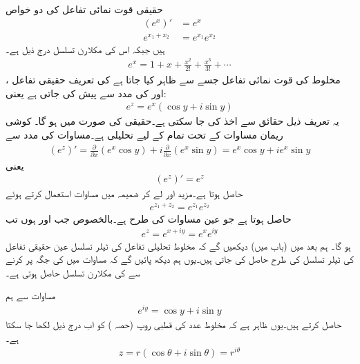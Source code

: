 حقیقی قوت نمائی تفاعل  کی دو خواص
\begin{align}
(e^x)'&=e^x\label{مساوات_مخلوط_قوت_نمائی_حقیقی_الف}\\
e^{x_1+x_2}&=e^{x_1}e^{x_2}\label{مساوات_مخلوط_قوت_نمائی_حقیقی_ب}
\end{align}
ہیں جبکہ اس کی مکلارن تسلسل درج ذیل ہے۔
\begin{align}
e^x=1+x+\frac{x^2}{2!}+\frac{x^3}{3!}+\cdots\label{مساوات_مخلوط_قوت_نمائی_حقیقی_پ}
\end{align}
مخلوط  کی قوت نمائی تفاعل جسے  سے ظاہر کیا جاتا ہے کی تعریف حقیقی تفاعل ،  اور  کی مدد سے پیش کی جاتی ہے یعنی:
\begin{align}\label{مساوات_مخلوط_قوت_نمائی_تعریف_الف}
e^z=e^x(\cos y+i\sin y)
\end{align} 
یہ تعریف ذیل حقائق سے اخذ کی جا سکتی ہے۔حقیقی  کی صورت میں  ہو گا۔ کوشی ریمان مساوات کے تحت  تمام  کے لیے تحلیلی ہے۔مساوات  کی مدد سے
\begin{align*}
(e^z)'=\frac{\partial}{\partial x}(e^x\cos y)+i\frac{\partial}{\partial x}(e^x\sin y)=e^x\cos y+ie^x\sin y
\end{align*}
یعنی
\begin{align}\label{مساوات_مخلوط_قوت_نمائی_تعریف_ب}
(e^z)'=e^z
\end{align}
حاصل ہوتا ہے۔مزید  اور  لے کر  ضمیمہ  میں مساوات  استعمال کرتے ہوئے
\begin{align}\label{مساوات_مخلوط_قوت_نمائی_تعریف_پ}
e^{z_1+z_2}=e^{z_1}e^{z_2}
\end{align}
حاصل ہوتا ہے جو عین مساوات  کی طرح ہے۔بالخصوص جب  اور  ہوں تب
\begin{align}\label{مساوات_مخلوط_قوت_نمائی_تعریف_ت}
e^z=e^{x+iy}=e^xe^{iy}
\end{align}
ہو گا۔ ہم بعد میں (باب  میں)  دیکھیں گے کہ مخلوط تحلیلی تفاعل کی ٹیلر تسلسل عین حقیقی تفاعل کی ٹیلر تسلسل کی طرح حاصل کی جاتی ہیں۔یوں ہم دیکھ پائیں گے کہ مساوات  میں  کی جگہ  پر کرنے سے  کی مکلارن تسلسل حاصل ہوتی ہے۔

مساوات  سے ہم 
\begin{align}\label{مساوات_مخلوط_قوت_نمائی_تعریف_ٹ}
e^{iy}=\cos y+i\sin y
\end{align} 
حاصل کرتے ہیں۔یوں ظاہر  ہے کہ مخلوط عدد  کی قطبی روپ (حصہ ) کو اب درج ذیل لکھا جا سکتا ہے۔
\begin{align}\label{مساوات_مخلوط_قوت_نمائی_تعریف_ث}
z=r(\cos \theta+i\sin \theta)=r^{i\theta}
\end{align}

